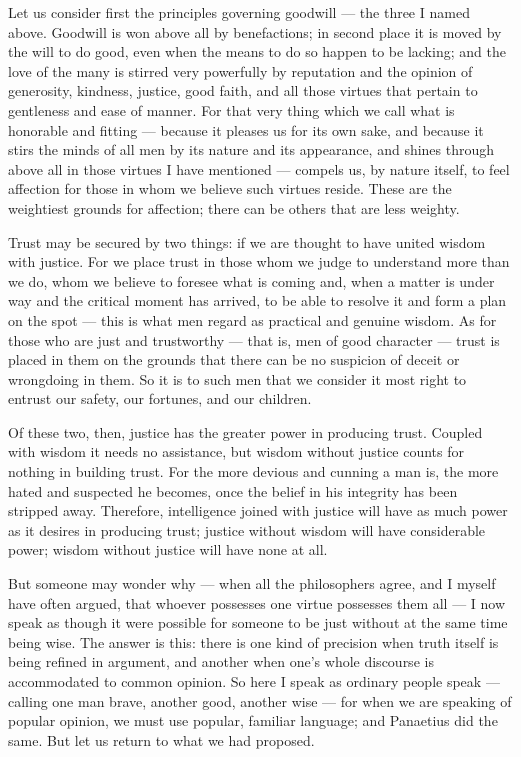  Let us consider first the principles governing goodwill — the three I named above. Goodwill is won above all by benefactions; in second place it is moved by the will to do good, even when the means to do so happen to be lacking; and the love of the many is stirred very powerfully by reputation and the opinion of generosity, kindness, justice, good faith, and all those virtues that pertain to gentleness and ease of manner. For that very thing which we call what is honorable and fitting — because it pleases us for its own sake, and because it stirs the minds of all men by its nature and its appearance, and shines through above all in those virtues I have mentioned — compels us, by nature itself, to feel affection for those in whom we believe such virtues reside. These are the weightiest grounds for affection; there can be others that are less weighty.

 Trust may be secured by two things: if we are thought to have united wisdom with justice. For we place trust in those whom we judge to understand more than we do, whom we believe to foresee what is coming and, when a matter is under way and the critical moment has arrived, to be able to resolve it and form a plan on the spot — this is what men regard as practical and genuine wisdom. As for those who are just and trustworthy — that is, men of good character — trust is placed in them on the grounds that there can be no suspicion of deceit or wrongdoing in them. So it is to such men that we consider it most right to entrust our safety, our fortunes, and our children.

 Of these two, then, justice has the greater power in producing trust. Coupled with wisdom it needs no assistance, but wisdom without justice counts for nothing in building trust. For the more devious and cunning a man is, the more hated and suspected he becomes, once the belief in his integrity has been stripped away. Therefore, intelligence joined with justice will have as much power as it desires in producing trust; justice without wisdom will have considerable power; wisdom without justice will have none at all.

 But someone may wonder why — when all the philosophers agree, and I myself have often argued, that whoever possesses one virtue possesses them all — I now speak as though it were possible for someone to be just without at the same time being wise. The answer is this: there is one kind of precision when truth itself is being refined in argument, and another when one's whole discourse is accommodated to common opinion. So here I speak as ordinary people speak — calling one man brave, another good, another wise — for when we are speaking of popular opinion, we must use popular, familiar language; and Panaetius did the same. But let us return to what we had proposed.

